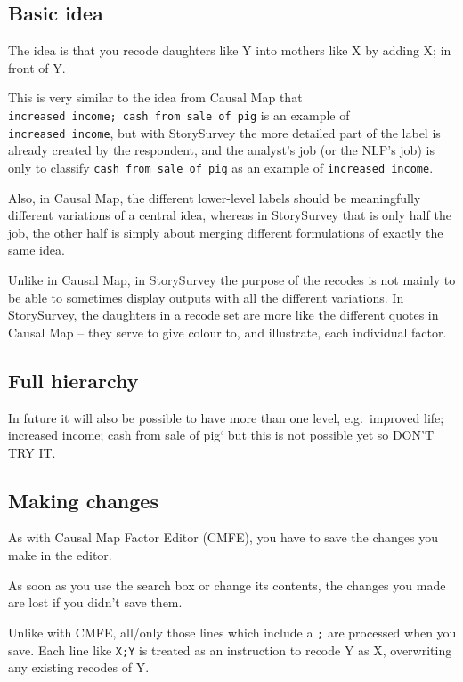 \documentclass[
]{book}
\begin{document}
\hypertarget{basic-idea}{%
\subsection{Basic idea}\label{basic-idea}}

The idea is that you recode daughters like Y into mothers like X by adding X; in front of Y.

This is very similar to the idea from Causal Map that \texttt{increased\ income;\ cash\ from\ sale\ of\ pig} is an example of \texttt{increased\ income}, but with StorySurvey the more detailed part of the label is already created by the respondent, and the analyst's job (or the NLP's job) is only to classify \texttt{cash\ from\ sale\ of\ pig} as an example of \texttt{increased\ income}.

Also, in Causal Map, the different lower-level labels should be meaningfully different variations of a central idea, whereas in StorySurvey that is only half the job, the other half is simply about merging different formulations of exactly the same idea.

Unlike in Causal Map, in StorySurvey the purpose of the recodes is not mainly to be able to sometimes display outputs with all the different variations. In StorySurvey, the daughters in a recode set are more like the different quotes in Causal Map -- they serve to give colour to, and illustrate, each individual factor.

\hypertarget{full-hierarchy}{%
\subsection{Full hierarchy}\label{full-hierarchy}}

In future it will also be possible to have more than one level, e.g.~improved life; increased income; cash from sale of pig` but this is not possible yet so DON'T TRY IT.

\hypertarget{making-changes}{%
\subsection{Making changes}\label{making-changes}}

As with Causal Map Factor Editor (CMFE), you have to save the changes you make in the editor.

As soon as you use the search box or change its contents, the changes you made are lost if you didn't save them.

Unlike with CMFE, all/only those lines which include a \texttt{;} are processed when you save. Each line like \texttt{X;Y} is treated as an instruction to recode Y as X, overwriting any existing recodes of Y.
\end{document}
